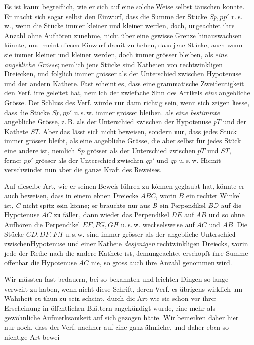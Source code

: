 %
Es ist kaum begreiflich, wie er sich auf eine solche Weise selbst täuschen konnte. Er macht sich sogar selbst den Einwurf, dass die Summe der Stücke \(Sp,pp'\) u.\,s.\,w., wenn die Stücke immer kleiner und kleiner werden, doch, ungeachtet ihre Anzahl ohne Aufhören zunehme, nicht über eine gewisse Grenze hinauswachsen könnte, und meint diesen Einwurf damit zu heben, dass jene Stücke, auch wenn sie immer kleiner und kleiner werden, doch immer grösser bleiben, als \textit{eine angebliche Grösse}; nemlich jene Stücke sind Katheten von rechtwinkligen Dreiecken, und folglich immer grösser als der Unterschied zwischen Hypotenuse und der andern Kathete. Fast scheint es, dass eine grammatische Zweideutigkeit den Verf. irre geleitet hat, nemlich der zwiefache Sinn des Artikels \textit{eine} angebliche Grösse. Der Schluss des Verf. würde nur dann richtig sein, wenn sich zeigen liesse, dass die Stücke \(Sp,pp'\) u.\,s.\,w. immer grösser bleiben. als \textit{eine bestimmte} angebliche Grösse, z.\,B. als der Unterschied zwischen der Hypotenuse \(pT\) und der Kathete \(ST\). Aber das lässt sich nicht beweisen, sondern nur, dass jedes Stück immer grösser bleibt, als eine angebliche Grösse, die aber selbst für jedes Stück eine andere ist, nemlich \(Sp\) grösser als der Unterschied zwischen \(pT\) und \(ST\), ferner \(pp'\) grösser als der Unterschied zwischen \(qp'\) und \(qp\) u.\,s.\,w. Hiemit verschwindet nun aber die ganze Kraft des Beweises.

Auf dieselbe Art, wie er seinen Beweis führen zu können geglaubt hat, könnte er auch beweisen, dass in einem ebnen Dreiecke \(ABC\), worin \(B\) ein rechter Winkel ist, \(C\) nicht spitz sein könne; er brauchte nur aus \(B\) ein Perpendikel \(BD\) auf die Hypotenuse \(AC\) zu fällen, dann wieder das Perpendikel \(DE\) auf \(AB\) und so ohne Aufhören die Perpendikel \(EF,FG,GH\) u.\,s.\,w. wechselsweise auf \(AC\) und \(AB\). Die Stücke \(CD,DF,FH\) u.\,s.\,w. sind immer grösser als der angebliche Unterschied zwischenHypotenuse und einer Kathete \textit{desjenigen} rechtwinkligen Dreiecks, worin jede der Reihe nach die andere Kathete ist, demungeachtet erschöpft ihre Summe offenbar die Hypotenuse \(AC\) nie, so gross auch ihre Anzahl genommen wird.

Wir müssten fast bedauern, bei so bekannten und leichten Dingen so lange verweilt zu haben, wenn nicht diese Schrift, deren Verf. es übrigens wirklich um Wahrheit zu thun zu sein scheint, durch die Art wie sie schon vor ihrer Erscheinung in öffentlichen Blättern angekündigt wurde, eine mehr als gewöhnliche Aufmerksamkeit auf sich gezogen hätte. Wir bemerken daher hier nur noch, dass der Verf. nachher auf eine ganz ähnliche, und daher eben so nichtige Art bewei%

